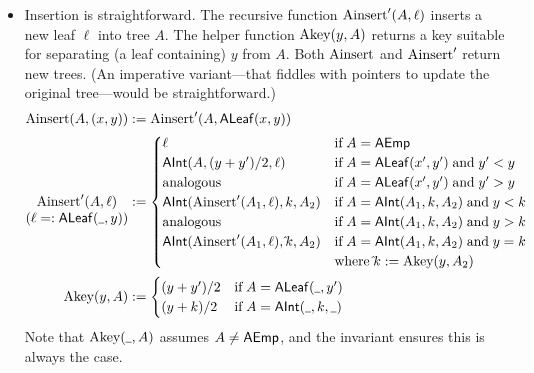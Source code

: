 \documentclass[a4paper]{article}
\newcommand{\any}{{\rule[-.2ex]{1ex}{.4pt}}}	%
\begin{document}
\begin{itemize}
\item
Insertion is straightforward.
The recursive function $\text{Ainsert}'(A, \ell)$ inserts a new leaf $\ell$ into tree $A$.
The helper function $\text{Akey}(y, A)$ returns a key suitable for separating (a leaf containing) $y$ from $A$.
Both $\text{Ainsert}$ and $\text{Ainsert}'$ return new trees.
(An imperative variant---that fiddles with pointers to update the original tree---would be straightforward.)
\begin{align*}
	\Ainsert(A, (x,y)) &:= \Ainsert'(A, \ALEAF(x,y)) \\
	\begin{array}[t]{@{}c@{}} \Ainsert'(A, \ell) \\ (\ell =: \ALEAF(\any,y)) \end{array} &:= \begin{cases}
		\ell	&\IF A = \AEMP \\
		\AINT(A, (y + y')/2, \ell)	&\IF A = \ALEAF(x',y') \AND y' <  y \\
		\text{analogous}	&\IF A = \ALEAF(x',y') \AND y' > y \\
		\AINT(\Ainsert'(A_1, \ell), k, A_2)	&\IF A = \AINT(A_1, k, A_2) \AND y < k \\
		\text{analogous}	&\IF A = \AINT(A_1, k, A_2) \AND y > k \\
		\AINT(\Ainsert'(A_1, \ell), \hat k, A_2)	&\IF A = \AINT(A_1,k, A_2) \AND y = k \\
		&\WHERE \hat k := \Akey(y, A_2)
	\end{cases} \\
	\Akey(y, A) &:= \begin{cases}
		(y+y')/2	&\IF A = \ALEAF(\any, y') \\
		(y+k)/2	&\IF A = \AINT(\any, k, \any)
	\end{cases}
\end{align*}
Note that $\Akey(\any, A)$ assumes $A \not= \mathsf{AEmp}$, and the invariant ensures this is always the case.


\end{itemize}
\end{document}
